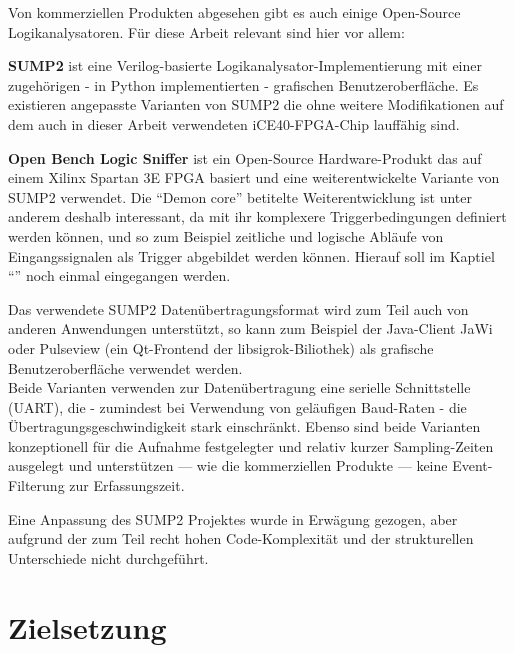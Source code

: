 Von kommerziellen Produkten abgesehen gibt es auch einige Open-Source Logikanalysatoren. Für diese Arbeit relevant sind hier vor allem:
\begin{description}
	\item \textbf{SUMP2} ist eine \gls{Verilog}-basierte Logikanalysator-Implementierung mit einer zugehörigen - in Python implementierten - grafischen Benutzeroberfläche. Es existieren angepasste Varianten von SUMP2 die ohne weitere Modifikationen auf dem auch in dieser Arbeit verwendeten iCE40-FPGA-Chip lauffähig sind\cite{web:blackmesa_sump2}.  
	\item \textbf{Open Bench Logic Sniffer} ist ein Open-Source Hardware-Produkt das auf einem Xilinx Spartan 3E FPGA basiert und eine weiterentwickelte Variante von SUMP2 verwendet. Die ``Demon core'' betitelte Weiterentwicklung ist unter anderem deshalb interessant, da mit ihr komplexere Triggerbedingungen definiert werden können, und so zum Beispiel zeitliche und logische Abläufe von Eingangssignalen als Trigger abgebildet werden können. Hierauf soll im Kaptiel ``'' noch einmal eingegangen werden.
\end{description}

Das verwendete SUMP2 Datenübertragungsformat wird zum Teil auch von anderen Anwendungen unterstützt, so kann zum Beispiel der Java-Client JaWi\cite{web:ols} oder Pulseview\cite{web:sigrok_ols} (ein Qt-Frontend der libsigrok-Biliothek) als grafische Benutzeroberfläche verwendet werden.\\ 
Beide Varianten verwenden zur Datenübertragung eine serielle Schnittstelle (\acrshort{UART}), die - zumindest bei Verwendung von geläufigen Baud-Raten - die Übertragungsgeschwindigkeit stark einschränkt. Ebenso sind beide Varianten konzeptionell für die Aufnahme festgelegter und relativ kurzer Sampling-Zeiten ausgelegt und unterstützen --- wie die kommerziellen Produkte --- keine Event-Filterung zur Erfassungszeit.  

Eine Anpassung des SUMP2 Projektes wurde in Erwägung gezogen, aber aufgrund der zum Teil recht hohen Code-Komplexität und der strukturellen Unterschiede nicht durchgeführt.

\section{Zielsetzung}
\label{ch:Einfuehrung:Zielsetzung}

